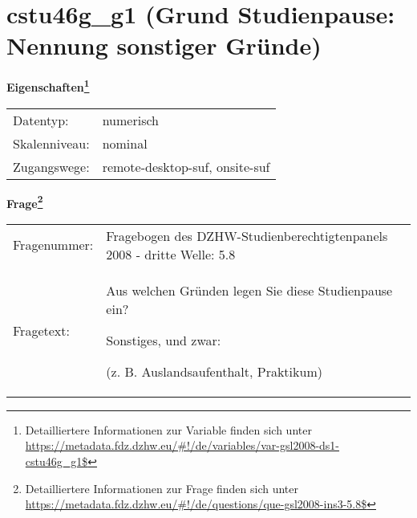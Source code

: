 
    \setcounter{footnote}{0}

    \vspace*{-1.8cm}
	\section{cstu46g\_g1 (Grund Studienpause: Nennung sonstiger Gründe)}
	\label{section:cstu46g_g1}



    \vspace*{0.5cm}
    \noindent\textbf{Eigenschaften\footnote{Detailliertere Informationen zur Variable finden sich unter
		\url{https://metadata.fdz.dzhw.eu/\#!/de/variables/var-gsl2008-ds1-cstu46g_g1$}}}\\
	\begin{tabularx}{\hsize}{@{}lX}
	Datentyp: & numerisch \\
	Skalenniveau: & nominal \\
	Zugangswege: &
	  remote-desktop-suf, 
	  onsite-suf
 \\
    \end{tabularx}



				\vspace*{0.5cm}
                \noindent\textbf{Frage\footnote{Detailliertere Informationen zur Frage finden sich unter
		              \url{https://metadata.fdz.dzhw.eu/\#!/de/questions/que-gsl2008-ins3-5.8$}}}\\
				\begin{tabularx}{\hsize}{@{}lX}
					Fragenummer: &
					  Fragebogen des DZHW-Studienberechtigtenpanels 2008 - dritte Welle:
					  5.8
 \\
					Fragetext: & Aus welchen Gründen legen Sie diese Studienpause ein?\par  Sonstiges, und zwar:\par  (z. B. Auslandsaufenthalt, Praktikum) \\
				\end{tabularx}





